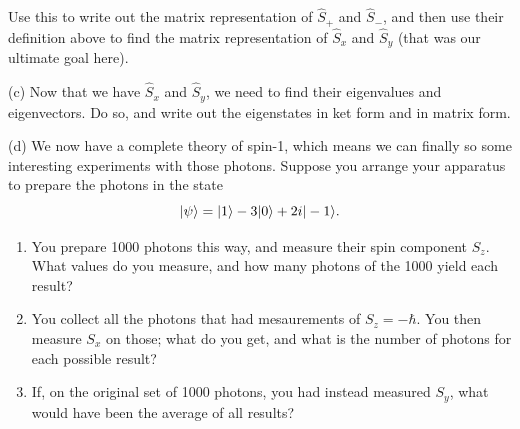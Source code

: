 \begin{problem}[Spin-1]
Use this to write out the matrix representation of $\hat{S}_+$ and $\hat{S}_-$, and then use their definition above to find the matrix representation of $\hat{S}_x$ and $\hat{S}_y$ (that was our ultimate goal here).

(c) Now that we have $\hat{S}_x$ and $\hat{S}_y$, we need to find their eigenvalues and eigenvectors.  Do so, and write out the eigenstates in ket form and in matrix form.

(d) We now have a complete theory of spin-1, which means we can finally so some interesting experiments with those photons.  Suppose you arrange your apparatus to prepare the photons in the state
\[
| \psi \rangle = | 1 \rangle - 3| 0 \rangle + 2i| -1 \rangle.
\]
\begin{enumerate}[label=\roman*.	]
\item You prepare 1000 photons this way, and measure their spin component $S_z$.  What values do you measure, and how many photons of the 1000 yield each result?
\item You collect all the photons that had mesaurements of $S_z = -\hbar$.  You then measure $S_x$ on those; what do you get, and what is the number of photons for each possible result?
\item If, on the original set of 1000 photons, you had instead measured $S_y$, what would have been the average of all results?
\end{enumerate}

\end{problem}



